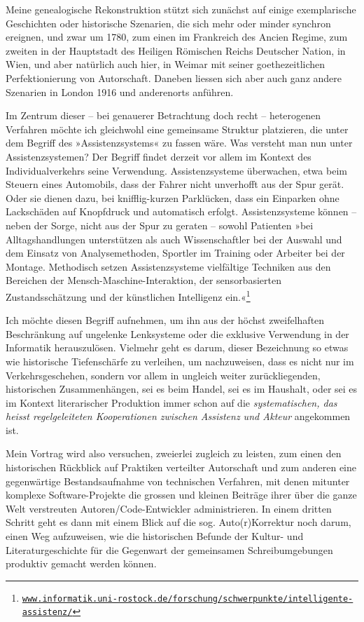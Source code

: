 \documentclass[a4paper,11pt]{article}
\newcommand{\anf}[1]{»#1«}
\begin{document}
Meine genealogische Rekonstruktion stützt sich zunächst auf einige exemplarische Geschichten oder historische Szenarien, die sich mehr oder minder synchron ereignen, und zwar um 1780, zum einen im Frankreich des Ancien Regime, zum zweiten in der Hauptstadt des Heiligen Römischen Reichs Deutscher Nation, in Wien, und aber natürlich auch hier, in Weimar mit seiner goethezeitlichen Perfektionierung von Autorschaft. Daneben liessen sich aber auch ganz andere Szenarien in London 1916 und anderenorts anführen. 

\enlargethispage{6mm}

Im Zentrum dieser – bei genauerer Betrachtung doch recht – heterogenen Verfahren möchte ich gleichwohl eine gemeinsame Struktur platzieren, die unter dem Begriff des \anf{Assistenzsystems} zu fassen wäre. Was versteht man nun unter Assistenzsystemen? Der Begriff findet derzeit vor allem im Kontext des Individualverkehrs seine Verwendung. Assistenzsysteme überwachen, etwa beim Steuern eines Automobils, dass der Fahrer nicht unverhofft aus der Spur gerät. Oder sie dienen dazu, bei knifflig-kurzen Parklücken, dass ein Einparken ohne Lackschäden auf Knopfdruck und automatisch erfolgt. Assistenzsysteme können – neben der Sorge, nicht aus der Spur zu geraten – sowohl Patienten \anf{bei Alltagshandlungen unterstützen als auch Wissenschaftler bei der Auswahl und dem Einsatz von Analysemethoden, Sportler im Training oder Arbeiter bei der Montage. Methodisch setzen Assistenzsysteme vielfältige Techniken aus den Bereichen der Mensch-Maschine-Interaktion, der sensorbasierten Zustandsschätzung und der künstlichen Intelligenz ein.}\footnote{\href{https://www.informatik.uni-rostock.de/forschung/schwerpunkte/intelligente-assistenz/}{\texttt{www.informatik.uni-rostock.de/forschung/schwerpunkte/intelligente-assistenz/}}}

Ich möchte diesen Begriff aufnehmen, um ihn aus der höchst zweifelhaften Beschränkung auf ungelenke Lenksysteme oder die exklusive Verwendung in der Informatik herauszulösen. Vielmehr geht es darum, dieser Bezeichnung so etwas wie historische Tiefenschärfe zu verleihen, um nachzuweisen, dass es nicht nur im Verkehrsgeschehen, sondern vor allem in ungleich weiter zurückliegenden, historischen Zusammenhängen, sei es beim Handel, sei es im Haushalt, oder sei es im Kontext literarischer Produktion immer schon auf die \emph{systematischen, das heisst regelgeleiteten Kooperationen zwischen Assistenz und Akteur} angekommen ist. 

Mein Vortrag wird also versuchen, zweierlei zugleich zu leisten, zum einen den historischen Rückblick auf Praktiken verteilter Autorschaft und zum anderen eine gegenwärtige Bestandsaufnahme von technischen Verfahren, mit denen mitunter komplexe Software-Projekte die grossen und kleinen Beiträge ihrer über die ganze Welt verstreuten Autoren/Code-Entwickler administrieren. In einem dritten Schritt geht es dann mit einem Blick auf die sog. Auto(r)Korrektur noch darum, einen Weg aufzuweisen, wie die historischen Befunde der Kultur- und Literaturgeschichte für die Gegenwart der gemeinsamen Schreibumgebungen produktiv gemacht werden können. 
\end{document}

